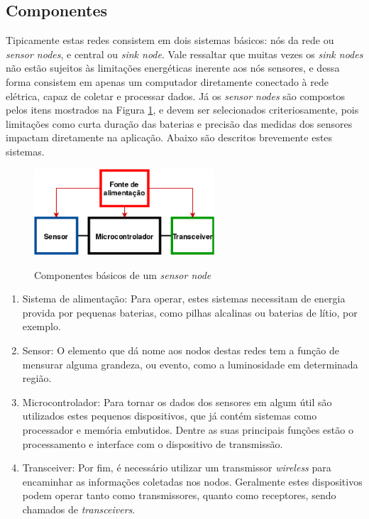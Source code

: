\documentclass[oneside,openright,12pt]{ufsm_2015} %
\begin{document}
\subsection{Componentes}
Tipicamente estas redes consistem em dois sistemas básicos: nós da rede ou \textit{sensor nodes}, e central ou \textit{sink node}. 
Vale ressaltar que muitas vezes os \textit{sink nodes} não estão sujeitos às limitações energéticas inerente aos nós sensores, e dessa  forma consistem em apenas um computador diretamente conectado à rede elétrica, capaz de coletar e processar dados. Já os \textit{sensor nodes} são compostos pelos itens mostrados na Figura \ref{fig:sensor-node-components}, e devem ser selecionados criteriosamente, pois limitações como curta duração das baterias e precisão das medidas dos sensores impactam diretamente na aplicação. Abaixo são descritos brevemente estes sistemas.

\begin{figure}[ht]
 	    \caption{\label{exepretex} Componentes básicos de um \textit{sensor node}}
    \centering
    \includegraphics[width=0.6\textwidth]{figuras/sensor-node-components.png}
    \vspace{\baselineskip} %
        \label{fig:sensor-node-components}
\end{figure}

\begin{enumerate}
    \item Sistema de alimentação: Para operar, estes sistemas necessitam de energia provida por pequenas baterias, como pilhas alcalinas ou baterias de lítio, por exemplo.
    \item Sensor: O elemento que dá nome aos nodos destas redes tem a função de mensurar alguma grandeza, ou evento, como a luminosidade em determinada região.
    \item Microcontrolador: Para tornar os dados dos sensores em algum útil são utilizados estes pequenos dispositivos, que já contém sistemas como processador e memória embutidos. Dentre as suas principais funções estão o processamento e interface com o dispositivo de transmissão.
    \item Transceiver: Por fim, é necessário utilizar um transmissor \textit{wireless} para encaminhar as informações coletadas nos nodos. Geralmente estes dispositivos podem operar tanto como transmissores, quanto como receptores, sendo chamados de \textit{transceivers}.
\end{enumerate}
\end{document}
